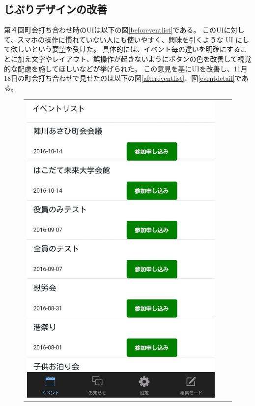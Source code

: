 \subsection{じぷりデザインの改善}
第４回町会打ち合わせ時のUIは以下の図\ref{beforeventlist}である。
このUIに対して、スマホの操作に慣れていない人にも使いやすく、興味を引くような UI にして欲しいという要望を受けた。
具体的には、イベント毎の違いを明確にすることに加え文字やレイアウト、誤操作が起きないようにボタンの色を改善して視覚的な配慮を施してほしいなどが挙げられた。
この意見を基にUIを改善し、11月18日の町会打ち合わせで見せたのは以下の図\ref{aftereventlist}、図\ref{eventdetail}である。

\begin{figure}[h]
    \begin{tabular}{ccc}
      \begin{minipage}[t]{0.3\hsize}
        \centering
        \includegraphics[keepaspectratio, scale=0.09]{picture/ui_update/beforupdate.png}

\end{minipage}
\end{tabular}
\end{figure}
